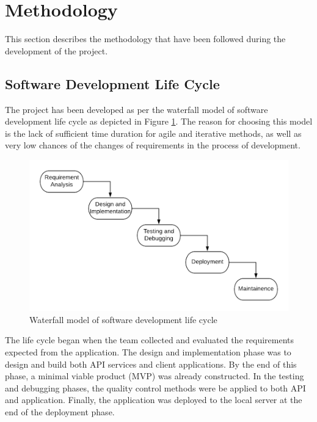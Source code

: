 \documentclass[12pt, a4paper, oneside]{article}
\begin{document}
\break
\section{Methodology}
This section describes the methodology that have been followed during the development of the project.

\subsection{Software Development Life Cycle}
The project has been developed as per the waterfall model of software development life cycle as depicted in Figure \ref{fig:sdlc}. The reason for choosing this model is the lack of sufficient time duration for agile and iterative methods, as well as very low chances of the changes of requirements in the process of development. 

\begin{figure}[h]
	\includegraphics[width=\linewidth]{sdlc}
	\centering
	\caption{Waterfall model of software development life cycle}
	\label{fig:sdlc}
\end{figure}

The life cycle began when the team collected and evaluated the requirements expected from the application. The design and implementation phase was to design and build both API services and client applications. By the end of this phase, a minimal viable product (MVP) was already constructed. In the testing and debugging phases, the quality control methods were be applied to both API and application. Finally, the application was deployed to the local server at the end of the deployment phase. 
\end{document}

